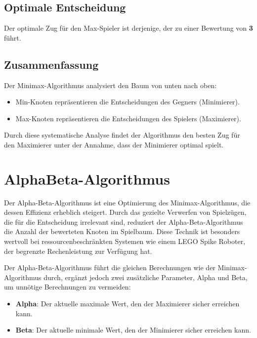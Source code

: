\subsection*{Optimale Entscheidung}

Der optimale Zug für den Max-Spieler ist derjenige, der zu einer Bewertung von \textbf{3} führt.

\subsection*{Zusammenfassung}

Der Minimax-Algorithmus analysiert den Baum von unten nach oben:
\begin{itemize}
	\item Min-Knoten repräsentieren die Entscheidungen des Gegners (Minimierer).
	\item Max-Knoten repräsentieren die Entscheidungen des Spielers (Maximierer).
\end{itemize}

Durch diese systematische Analyse findet der Algorithmus den besten Zug für den Maximierer unter der Annahme, dass der Minimierer optimal spielt.



\section{AlphaBeta-Algorithmus}

Der Alpha-Beta-Algorithmus ist eine Optimierung des Minimax-Algorithmus, die dessen Effizienz erheblich steigert. Durch das gezielte Verwerfen von Spielzügen, die für die Entscheidung irrelevant sind, reduziert der Alpha-Beta-Algorithmus die Anzahl der bewerteten Knoten im Spielbaum. Diese Technik ist besonders wertvoll bei ressourcenbeschränkten Systemen wie einem LEGO Spike Roboter, der begrenzte Rechenleistung zur Verfügung hat.

Der Alpha-Beta-Algorithmus führt die gleichen Berechnungen wie der Minimax-Algorithmus durch, ergänzt jedoch zwei zusätzliche Parameter, Alpha und Beta, um unnötige Berechnungen zu vermeiden:

\begin{itemize}
	\item \textbf{Alpha}: Der aktuelle maximale Wert, den der Maximierer sicher erreichen kann.
	\item \textbf{Beta}: Der aktuelle minimale Wert, den der Minimierer sicher erreichen kann.
\end{itemize}

